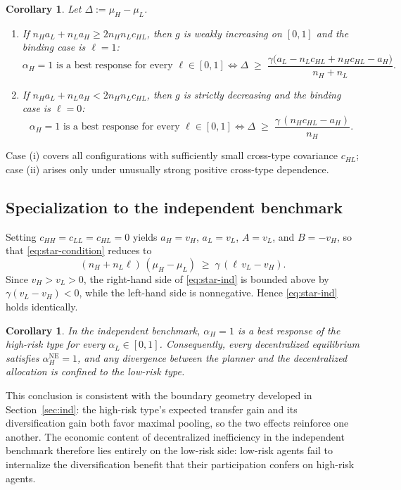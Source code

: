 \documentclass[a4paper,12pt]{article}
\newtheorem{corollary}[theorem]{Corollary}
\theoremstyle{definition}
\theoremstyle{remark}
\newcommand{\1}{\mathbf{1}}
\begin{document}
\begin{corollary}\label{cor:worst-ell}
Let \(\Delta:=\mu_H-\mu_L\).
\begin{enumerate}[leftmargin=2em,label=(\roman*)]
\item If \(n_H a_L+n_L a_H\ge 2n_Hn_L c_{HL}\), then \(g\) is weakly
increasing on \([0,1]\) and the binding case is \(\ell=1\):
\[
\alpha_H=1\text{ is a best response for every }\ell\in[0,1]
\iff
\Delta\;\ge\;\frac{\gamma\bigl(a_L-n_L c_{HL}+n_Hc_{HL}-a_H\bigr)}{n_H+n_L}.
\]
\item If \(n_H a_L+n_L a_H< 2n_Hn_L c_{HL}\), then \(g\) is strictly
decreasing and the binding case is \(\ell=0\):
\[
\alpha_H=1\text{ is a best response for every }\ell\in[0,1]
\iff
\Delta\;\ge\;\frac{\gamma\,(n_Hc_{HL}-a_H)}{n_H}.
\]
\end{enumerate}
\end{corollary}

Case (i) covers all configurations with sufficiently small cross-type
covariance \(c_{HL}\); case (ii) arises only under unusually strong positive
cross-type dependence.

\subsection{Specialization to the independent benchmark}

Setting \(c_{HH}=c_{LL}=c_{HL}=0\) yields \(a_H=v_H\), \(a_L=v_L\),
\(A=v_L\), and \(B=-v_H\), so that \eqref{eq:star-condition} reduces to
\begin{equation}
(n_H+n_L\ell)\,(\mu_H-\mu_L)\;\ge\;\gamma\,(\ell\,v_L-v_H).
\label{eq:star-ind}
\end{equation}
Since \(v_H>v_L>0\), the right-hand side of \eqref{eq:star-ind} is bounded
above by \(\gamma(v_L-v_H)<0\), while the left-hand side is nonnegative.
Hence \eqref{eq:star-ind} holds identically.

\begin{corollary}\label{cor:ind-alphaH1}
In the independent benchmark, \(\alpha_H=1\) is a best response of the
high-risk type for every \(\alpha_L\in[0,1]\). Consequently, every
decentralized equilibrium satisfies \(\alpha_H^{\mathrm{NE}}=1\), and any
divergence between the planner and the decentralized allocation is confined to
the low-risk type.
\end{corollary}

This conclusion is consistent with the boundary geometry developed in
Section~\ref{sec:ind}: the high-risk type's expected transfer gain and its
diversification gain both favor maximal pooling, so the two effects reinforce
one another. The economic content of decentralized inefficiency in the
independent benchmark therefore lies entirely on the low-risk side: low-risk
agents fail to internalize the diversification benefit that their
participation confers on high-risk agents.
\end{document}
